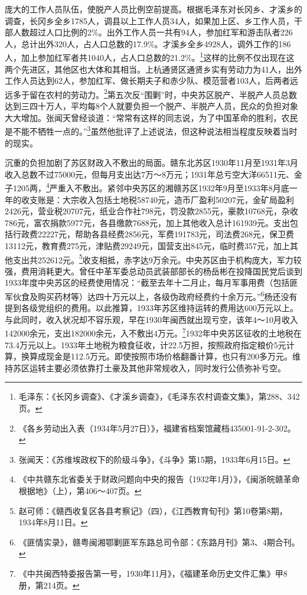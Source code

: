 庞大的工作人员队伍，使脱产人员比例空前提高。根据毛泽东对长冈乡、才溪乡的调查，长冈乡全乡1785人，调县以上工作人员34人，如果加上区、乡工作人员，干部人数超过人口比例的2\%。出外工作人员一共有94人，参加红军和游击队者226人，总计出外320人，占人口总数的17.9\%。才溪乡全乡4928人，调外工作的186人，加上参加红军者共1040人，占人口总数的21.2\%。\footnote{毛泽东：《长冈乡调查》、《才溪乡调查》，《毛泽东农村调查文集》，第288、342页。}这样的比例不仅出现在这两个先进区，其他区也大体和其相当。上杭通贤区通贤乡实有劳动力为41人，出外工作人员达到62人，参加红军、做长期夫子和赤少队、模范营者103人，后两者远远多于留在农村的劳动力。\footnote{《各乡劳动出入表（1934年5月27日）》，福建省档案馆藏档435001-91-2-302。}第五次反“围剿”时，中央苏区脱产、半脱产人员总数达到三四十万人，平均每8个人就要负担一个脱产、半脱产人员，民众的负担对象大大增加。张闻天曾经谈道：“常常有这样的同志说，为了中国革命的胜利，农民是不能不牺牲一点的。”\footnote{张闻天：《苏维埃政权下的阶级斗争》，《斗争》第15期，1933年6月15日。}虽然他批评了上述说法，但这种说法相当程度反映着当时的现实。


沉重的负担加剧了苏区财政入不敷出的局面。赣东北苏区1930年11月至1931年3月收入总数不过75000元，但每月支出达7万～8万元；1931年总亏空大洋66511元、金子1205两，\footnote{《中共赣东北省委关于财政问题向中央的报告（1932年1月）》，《闽浙皖赣革命根据地》（上），第406～407页。}严重入不敷出。紧邻中央苏区的湘赣苏区1932年9月至1933年8月底一年的收支账是：大宗收入包括土地税58740元，造币厂盈利50207元，金矿局盈利2426元，营业税20707元，纸业合作社798元，罚没款2855元，豪款10768元，杂收786元，富农捐款5977元，各县缴款7688元，加上其他收入总计161939元。支出包括行政费22227元，帮助各县经费2856元，军费191783元，司法费268元，保卫费13112元，教育费275元，津贴费29249元，国营支出845元，临时费357元，加上其他支出共252612元。\footnote{赵可师：《赣西收复区各县考察记》（四），《江西教育旬刊》第10卷第8期，1934年8月11日。}收支相抵，赤字达9万余元。中央苏区由于机构庞大，军力较强，费用消耗更大。曾任中革军委总动员武装部部长的杨岳彬在投降国民党后谈到1933年度中央苏区的经费使用情况：“截至去年十二月止，每月军事用费（包括匪军伙食及购买药材等）达四十万元以上，各级伪政府经费约十余万元。”\footnote{《匪情实录》，赣粤闽湘鄂剿匪军东路总司令部：《东路月刊》第3、4期合刊。}杨还没有提到各级党组织的费用。以此推算，1933年苏区维持运转的费用达600万元以上。与此同时，收入状况却不容乐观，早在1930年闽西就出现亏空，该年4～10月收入142000余元，支出182000余元，入不敷出4万元。\footnote{《中共闽西特委报告第一号，1930年11月》，《福建革命历史文件汇集》甲8册，第214页。}1932年中央苏区征收的土地税在73.4万元以上。1933年土地税为粮食征收，计22.5万担，按照政府指定粮价5元计算，换算成现金是112.5万元。即使按照市场价格翻番计算，也只有200多万元。维持苏区运转主要必须依靠打土豪及其他非常规收入，同时发行公债弥补亏空。


